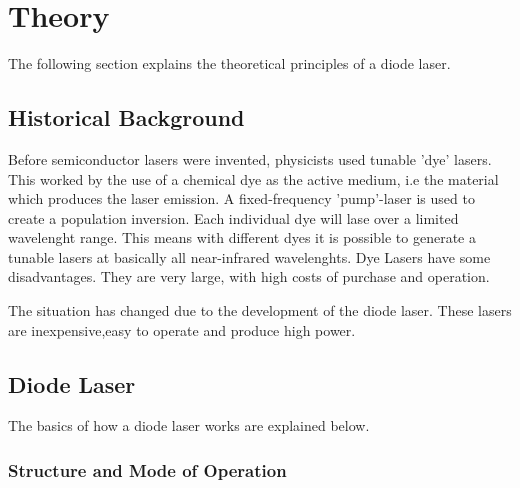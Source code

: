\section[Theory]{Theory \textnormal{\cite{diode_laser}}}
\label{sec:theory}

The following section explains the theoretical principles of a diode laser.

\subsection{Historical Background}
\label{sec:Historical Background}

Before semiconductor lasers were invented, physicists used tunable 'dye' lasers.
This worked by the use of a chemical dye as the active medium, i.e the material which produces the laser emission.
A fixed-frequency 'pump'-laser is used to create a population inversion. Each individual dye will lase over a limited wavelenght range.
This means with different dyes it is possible to generate a tunable lasers at basically all near-infrared wavelenghts.
Dye Lasers have some disadvantages. They are very large, with high costs of purchase and operation.

The situation has changed due to the development of the diode laser. These lasers are inexpensive,easy to operate and produce high power.

\subsection{Diode Laser}
\label{sec:Diode Laser}

The basics of how a diode laser works are explained below.

\subsubsection{Structure and Mode of Operation}
\label{Structure and Mode of Operation}

